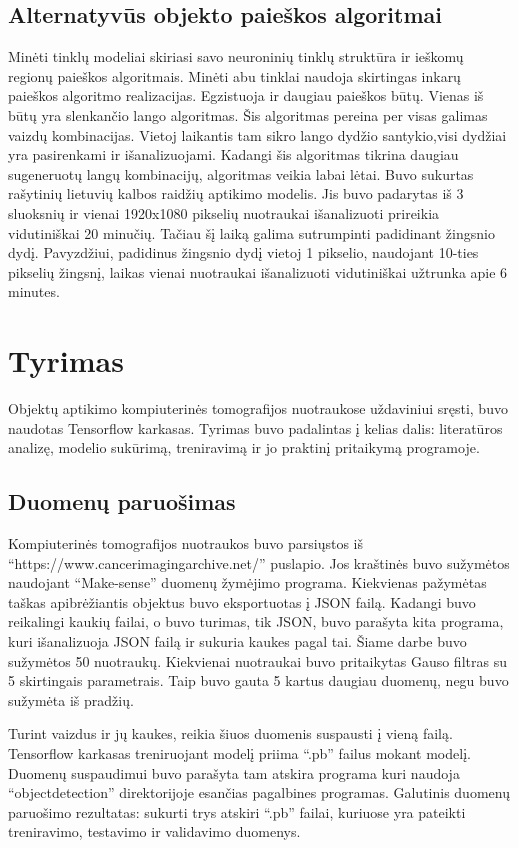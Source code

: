 \documentclass{VUMIFInfKursinis}
\begin{document}
\subsection{Alternatyvūs objekto paieškos algoritmai}
\par
Minėti tinklų modeliai skiriasi savo neuroninių tinklų struktūra ir ieškomų regionų
paieškos algoritmais. Minėti abu tinklai naudoja skirtingas inkarų paieškos algoritmo
realizacijas. Egzistuoja ir daugiau paieškos būtų. Vienas iš būtų yra slenkančio lango
algoritmas. Šis algoritmas pereina per visas galimas vaizdų kombinacijas. Vietoj
laikantis tam sikro lango dydžio santykio,visi dydžiai yra pasirenkami ir išanalizuojami.
Kadangi šis algoritmas tikrina daugiau sugeneruotų langų kombinacijų, algoritmas veikia labai lėtai.
Buvo sukurtas rašytinių lietuvių kalbos raidžių aptikimo modelis. Jis buvo padarytas iš 3 sluoksnių
ir vienai 1920x1080 pikselių nuotraukai išanalizuoti prireikia vidutiniškai 20 minučių. Tačiau
šį laiką galima sutrumpinti padidinant žingsnio dydį. Pavyzdžiui, padidinus žingsnio dydį vietoj
1 pikselio, naudojant 10-ties pikselių žingsnį, laikas vienai nuotraukai išanalizuoti
vidutiniškai užtrunka apie 6 minutes.

\section{Tyrimas}
\par
Objektų aptikimo kompiuterinės tomografijos nuotraukose uždaviniui sręsti,
buvo naudotas Tensorflow karkasas.
Tyrimas buvo padalintas į kelias dalis: literatūros analizę, modelio
sukūrimą, treniravimą ir jo praktinį pritaikymą programoje.

\subsection{Duomenų paruošimas}
\par
Kompiuterinės tomografijos nuotraukos buvo parsiųstos iš
\enquote{https://www.cancerimagingarchive.net/} puslapio.
Jos kraštinės buvo sužymėtos naudojant \enquote{Make-sense} duomenų žymėjimo programa.
Kiekvienas pažymėtas taškas apibrėžiantis objektus buvo
eksportuotas į JSON failą. Kadangi buvo reikalingi kaukių failai, o buvo turimas,
tik JSON, buvo parašyta kita programa, kuri išanalizuoja JSON failą ir
sukuria kaukes pagal tai. Šiame darbe buvo sužymėtos 50 nuotraukų.
Kiekvienai nuotraukai buvo pritaikytas Gauso filtras su 5 skirtingais
parametrais. Taip buvo gauta 5 kartus daugiau duomenų, negu buvo
sužymėta iš pradžių.
\par
Turint vaizdus ir jų kaukes, reikia šiuos duomenis suspausti į vieną failą.
Tensorflow karkasas treniruojant modelį priima \enquote{.pb} failus mokant modelį.
Duomenų suspaudimui buvo parašyta tam atskira programa kuri naudoja \enquote{object\textunderscore detection}
direktorijoje esančias pagalbines programas.
Galutinis duomenų paruošimo rezultatas: sukurti trys atskiri \enquote{.pb}
failai, kuriuose yra pateikti treniravimo, testavimo ir validavimo duomenys.
\end{document}
